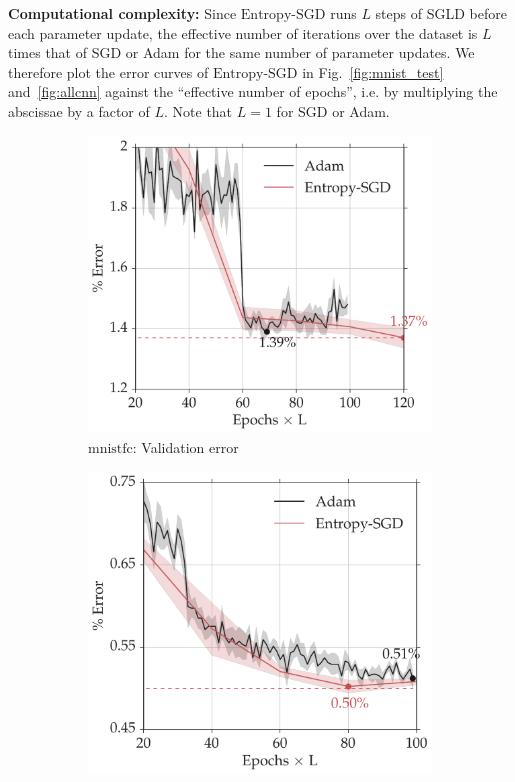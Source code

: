 \documentclass[10pt]{article}
\newcommand{\entropysgd}{\mathrm{Entropy}\textrm{-}\mathrm{SGD}}
\newcommand{\mnistfc}{\textrm{mnistfc}}
\begin{document}
\textbf{Computational complexity:} Since $\entropysgd$ runs $L$ steps of SGLD before each parameter update, the effective number of iterations over the dataset is $L$ times that of SGD or Adam for the same number of parameter updates. We therefore plot the error curves of $\entropysgd$ in Fig.~\ref{fig:mnist_test} and~\ref{fig:allcnn} against the ``effective number of epochs'', i.e. by multiplying the abscissae by a factor of $L$. Note that $L = 1$ for SGD or Adam.

\begin{figure}[htp!]
\centering
    \begin{subfigure}[t]{0.4\textwidth}
        \centering
        \includegraphics[width=1.02\textwidth]{mnistfc_valid.pdf}
        \caption{\small $\mnistfc$: Validation error}
        \label{fig:mnistfc_test}
    \end{subfigure}
    \hspace{0.2in}
    \begin{subfigure}[t]{0.4\textwidth}
        \centering
        \includegraphics[width=\textwidth]{lenet_valid.pdf}

\end{subfigure}
\end{figure}
\end{document}
